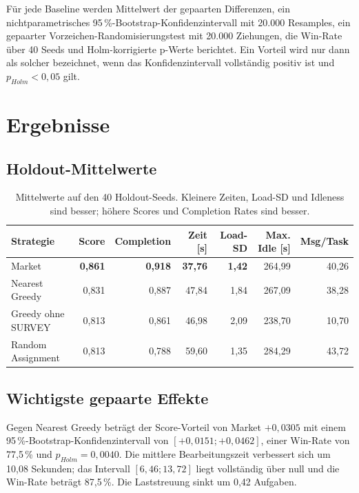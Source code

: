 \documentclass[11pt,a4paper]{article}
\begin{document}
Für jede Baseline werden Mittelwert der gepaarten Differenzen, ein nichtparametrisches
95\,\%-Bootstrap-Konfidenzintervall mit 20.000 Resamples, ein gepaarter
Vorzeichen-Randomisierungstest mit 20.000 Ziehungen, die Win-Rate über 40 Seeds und
Holm-korrigierte p-Werte berichtet. Ein Vorteil wird nur dann als solcher bezeichnet,
wenn das Konfidenzintervall vollständig positiv ist und $p_{Holm}<0{,}05$ gilt.

\section{Ergebnisse}

\subsection{Holdout-Mittelwerte}

\begin{table}[H]
\centering
\small
\begin{tabular}{@{}lrrrrrr@{}}
\toprule
Strategie & Score & Completion & Zeit [s] & Load-SD & Max. Idle [s] & Msg/Task\\
\midrule
Market & \textbf{0,861} & \textbf{0,918} & \textbf{37,76} & \textbf{1,42} & 264,99 & 40,26\\
Nearest Greedy & 0,831 & 0,887 & 47,84 & 1,84 & 267,09 & 38,28\\
Greedy ohne SURVEY & 0,813 & 0,861 & 46,98 & 2,09 & 238,70 & 10,70\\
Random Assignment & 0,813 & 0,788 & 59,60 & 1,35 & 284,29 & 43,72\\
\bottomrule
\end{tabular}
\caption{Mittelwerte auf den 40 Holdout-Seeds. Kleinere Zeiten, Load-SD und Idleness
sind besser; höhere Scores und Completion Rates sind besser.}
\end{table}

\subsection{Wichtigste gepaarte Effekte}

Gegen Nearest Greedy beträgt der Score-Vorteil von Market $+0{,}0305$ mit einem
95\,\%-Bootstrap-Konfidenzintervall von $[+0{,}0151;+0{,}0462]$, einer Win-Rate von
77,5\,\% und $p_{Holm}=0{,}0040$. Die mittlere Bearbeitungszeit verbessert sich um
10,08 Sekunden; das Intervall $[6{,}46;13{,}72]$ liegt vollständig über null und die
Win-Rate beträgt 87,5\,\%. Die Laststreuung sinkt um 0,42 Aufgaben.
\end{document}
